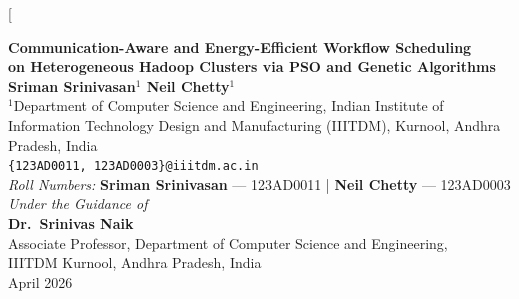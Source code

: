 \documentclass[10pt,twocolumn]{article}
\begin{document}
\twocolumn[{%
\begin{center}

{\LARGE \bfseries Communication-Aware and Energy-Efficient Workflow Scheduling\\
on Heterogeneous Hadoop Clusters via PSO and Genetic Algorithms}\\[0.5cm]

{\large \bfseries Sriman Srinivasan$^{1}$ \quad Neil Chetty$^{1}$}\\[0.25cm]

{\normalsize $^{1}$Department of Computer Science and Engineering,
Indian Institute of Information Technology Design and Manufacturing (IIITDM), Kurnool, Andhra Pradesh, India}\\[0.1cm]

{\normalsize \texttt{\{123AD0011, 123AD0003\}@iiitdm.ac.in}}\\[0.15cm]

{\small \textit{Roll Numbers:}
\textbf{Sriman Srinivasan} --- 123AD0011 \quad|\quad
\textbf{Neil Chetty} --- 123AD0003}\\[0.3cm]

{\small \textit{Under the Guidance of}}\\[0.1cm]
{\normalsize \textbf{Dr.~Srinivas Naik}}\\
{\small Associate Professor, Department of Computer Science and Engineering,\\
IIITDM Kurnool, Andhra Pradesh, India}\\[0.5cm]

{\small April 2026}\\[0.6cm]

\end{center}

}
\end{document}
